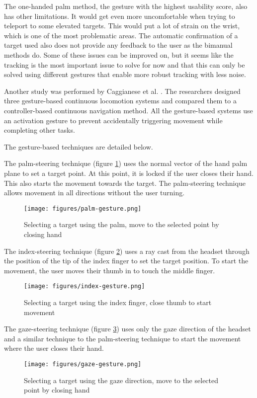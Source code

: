 The one-handed palm method, the gesture with the highest usability score, also has other limitations. It would get even more uncomfortable when trying to teleport to some elevated targets. This would put a lot of strain on the wrist, which is one of the most problematic areas. The automatic confirmation of a target used also does not provide any feedback to the user as the bimanual methods do. Some of these issues can be improved on, but it seems like the tracking is the most important issue to solve for now and that this can only be solved using different gestures that enable more robust tracking with less noise.



Another study was performed by Caggianese et al. \cite{Caggianese}. The researchers designed three gesture-based continuous locomotion systems and compared them to a controller-based continuous navigation method. All the gesture-based systems use an activation gesture to prevent accidentally triggering movement while completing other tasks.

The gesture-based techniques are detailed below.

The palm-steering technique (figure \ref{fig:palm}) uses the normal vector of the hand palm plane to set a target point. At this point, it is locked if the user closes their hand. This also starts the movement towards the target. The palm-steering technique allows movement in all directions without the user turning.
\begin{figure}[hbt!]
  \centering
  \texttt{[image: figures/palm-gesture.png]}
  \caption{Selecting a target using the palm, move to the selected point by closing hand}
  \label{fig:palm}
\end{figure}


The index-steering technique (figure \ref{fig:index}) uses a ray cast from the headset through the position of the tip of the index finger to set the target position. To start the movement, the user moves their thumb in to touch the middle finger.

\begin{figure}[hbt!]
  \centering
  \texttt{[image: figures/index-gesture.png]}
  \caption{Selecting a target using the index finger, close thumb to start movement}
  \label{fig:index}
\end{figure}


The gaze-steering technique (figure \ref{fig:gaze}) uses only the gaze direction of the headset and a similar technique to the palm-steering technique to start the movement where the user closes their hand.
\begin{figure}[hbt!]
  \centering
  \texttt{[image: figures/gaze-gesture.png]}
  \caption{Selecting a target using the gaze direction, move to the selected point by closing hand}
  \label{fig:gaze}
\end{figure}

